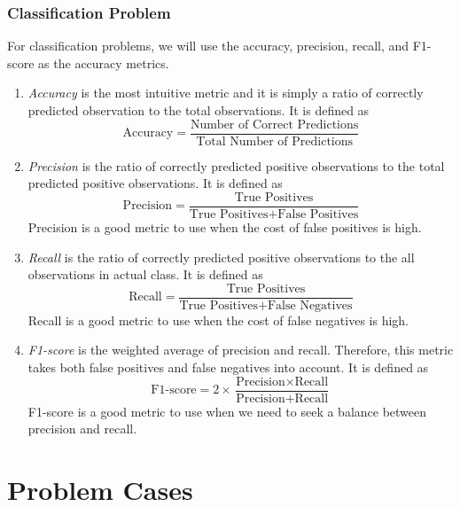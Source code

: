 \documentclass[conf]{new-aiaa}
\begin{document}
\subsubsection{Classification Problem}
For classification problems, we will use the accuracy, precision, recall, and F1-score as the accuracy metrics.
\begin{enumerate}
\item \textit{Accuracy} is the most intuitive metric and it is simply a ratio of correctly predicted observation to the total observations. It is defined as
\begin{equation} \label{eq:accuracy}
    \textrm{Accuracy} = \frac{\textrm{Number of Correct Predictions}}{\textrm{Total Number of Predictions}}
\end{equation}
\item \textit{Precision} is the ratio of correctly predicted positive observations to the total predicted positive observations. It is defined as
\begin{equation} \label{eq:precision}
    \textrm{Precision} = \frac{\textrm{True Positives}}{\textrm{True Positives} + \textrm{False Positives}}
\end{equation}
Precision is a good metric to use when the cost of false positives is high.
\item \textit{Recall} is the ratio of correctly predicted positive observations to the all observations in actual class. It is defined as
\begin{equation} \label{eq:recall}
    \textrm{Recall} = \frac{\textrm{True Positives}}{\textrm{True Positives} + \textrm{False Negatives}}
\end{equation}
Recall is a good metric to use when the cost of false negatives is high.
\item \textit{F1-score} is the weighted average of precision and recall. Therefore, this metric takes both false positives and false negatives into account. It is defined as
\begin{equation} \label{eq:f1score}
    \textrm{F1-score} = 2 \times \frac{\textrm{Precision} \times \textrm{Recall}}{\textrm{Precision} + \textrm{Recall}}
\end{equation}
F1-score is a good metric to use when we need to seek a balance between precision and recall.
\end{enumerate}
\section{Problem Cases}
\end{document}
